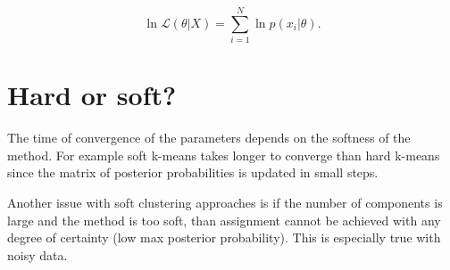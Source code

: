 \[
\ln \mathcal{L}(\theta |X) = \sum_{i=1}^N \ln p(x_i|\theta).
\]



%

\section{Hard or soft?}

The time of convergence of the parameters depends on the softness of the method.
For example soft k-means takes longer to converge than hard k-means since the matrix of posterior probabilities is updated in small steps.

Another issue with soft clustering approaches is if the number of components is large and the method is too soft, than assignment cannot be achieved with
any degree of certainty (low max posterior probability).
This is especially true with noisy data.


